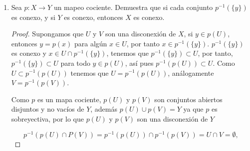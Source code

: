 \documentclass[11pt]{article}
\begin{document}
\begin{enumerate}
\begin{enumerate}
\begin{proof}
        \end{proof}
        
        \item Demuestra que la unión $Y$ de los espacios $X_K$ es conexa.
        
        \begin{proof}
            En efecto $a\in X_K$, $K\subset J$, $|K|\leq \infty$, entonces 

            $$\bigcup_{K} X_K 
                $$
                es conexo porque es unión de conexos que comparten un punto.
        \end{proof}

        \item Demuestra que $X$ es igual a la clausura de $Y$; concluye que $X$ es conexo.

    \begin{proof}
    Sea $\mathbf{x}\in X$ y $\displaystyle{U=\prod_{\alpha\in J}U_{\alpha}}$ una vecindad de $\mathbf{x}$, tenemos entonces que $U_{\alpha} = X_{\alpha}$ para todos salvo finitos índices $\alpha$; de esta manera, existe un elemento $\mathbf{y}\in U$ tal que $y_{\alpha}=a_{\alpha}$ para todos salvo finitos índices $\alpha$. Por lo tanto $U \cap Y \neq \emptyset$. De esta manera $X=\overline{Y}$; y ya que la clausura de un subespacio conexo de $X$ es conexa, tenemos que $X$ es conexo.
    \end{proof}
    \end{enumerate}
    
    \item Sea $p : X \to Y$ un mapeo cociente. Demuestra que si cada conjunto $p^{-1}(\{y\})$ es conexo, y si $Y$ es conexo, entonces $X$ es conexo.
    
    \begin{proof}
    Supongamos que $U$ y $V$ son una disconexión de $X$, si $y \in p(U)$, entonces $y = p(x)$ para algún $x \in U$, por tanto $x \in p^{-1}(\{y\})$.  $p^{-1}(\{y\})$ es conexo y $x \in U \cap p^{-1}(\{y\})$, tenemos que $p^{-1}(\{y\}) \subset U$, por tanto, $p^{-1}(\{y\}) \subset U$ para todo $y \in p(U)$, así pues $p^{-1}(p(U)) \subset U$. Como $U \subset p^{-1}(p(U))$ tenemos que $U = p^{-1}(p(U))$, análogamente $V=p^{-1}(p(V))$.

  Como $p$ es un mapa cociente, $p(U)$ y $p(V)$ son conjuntos abiertos disjuntos y no vacíos de $Y$, además $p(U) \cup p(V) = Y$ ya que $p$ es sobreyectiva, por lo que $p(U)$ y $p(V)$ son una disconexión de $Y$

    $$p^{-1}(p(U)\cap P(V))=p^{-1}(p(U))\cap p^{-1}(p(V))=U\cap V=\emptyset,$$


\end{proof}
\end{enumerate}
\end{document}
